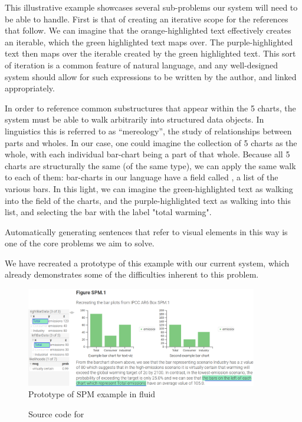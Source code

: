 This illustrative example showcases several sub-problems our system will need to be able to handle. First
is that of creating an iterative scope for the references that follow. We can imagine that the orange-highlighted
text effectively creates an iterable, which the green highlighted text maps over. The purple-highlighted text
then maps over the iterable created by the green highlighted text. This sort of iteration is a common feature of natural language,
and any well-designed system should allow for such expressions to be written by the author, and linked appropriately.

In order to reference common substructures that appear within the 5 charts, the system must be able to walk arbitrarily 
into structured data objects. In linguistics this is referred to as ``mereology'', the study of relationships
between parts and wholes. In our case, one could imagine the collection of 5 charts as the whole, with each
individual bar-chart being a part of that whole. Because all 5 charts are structurally the same (of the same type),
we can apply the same walk to each of them: bar-charts in our language have a field called , a list
of the various bars. In this light, we can imagine the green-highlighted text as walking into the  field
of the charts, and the purple-highlighted text as walking into this list, and selecting the bar with the label "total warming".

Automatically generating sentences that refer to visual elements in this way is one of the core problems we aim to solve.

We have recreated a prototype of this example with our current system, which already demonstrates
some of the difficulties inherent to this problem.

\begin{figure}
   \includegraphics[width=0.9\textwidth]{fig/figure-spm-fluid-mockup.png}
   \caption{Prototype of SPM example in fluid}
   \label{fig:figure-spm-fluid}
\end{figure}

\begin{figure}
   \tiny
   
   \caption{Source code for }
\end{figure}

